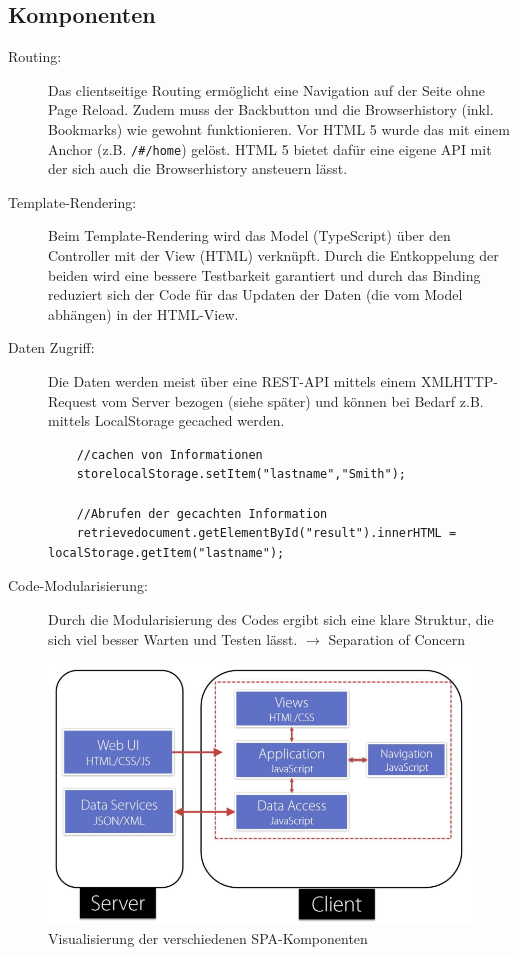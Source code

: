 \documentclass[a4paper, 11pt]{article}
\newcommand{\code}[1]{\texttt{#1}}
\begin{document}
\subsection{Komponenten}
\begin{description}
	\item[Routing: ] Das clientseitige Routing ermöglicht eine Navigation auf der Seite ohne Page Reload. Zudem muss der Backbutton und die Browserhistory (inkl. Bookmarks) wie gewohnt funktionieren. Vor HTML 5 wurde das mit einem Anchor (z.B. \code{/\#/home}) gelöst. HTML 5 bietet dafür eine eigene API mit der sich auch die Browserhistory ansteuern lässt.
	\item[Template-Rendering: ] Beim Template-Rendering wird das Model (TypeScript) über den Controller mit der View (HTML) verknüpft. Durch die Entkoppelung der beiden wird eine bessere Testbarkeit garantiert und durch das Binding reduziert sich der Code für das Updaten der Daten (die vom Model abhängen) in der HTML-View.
	\item[Daten Zugriff: ] Die Daten werden meist über eine REST-API mittels einem XMLHTTP-Request vom Server bezogen (siehe später) und können bei Bedarf z.B. mittels LocalStorage gecached werden. 
	\begin{lstlisting}
	//cachen von Informationen
	storelocalStorage.setItem("lastname","Smith");
	
	//Abrufen der gecachten Information
	retrievedocument.getElementById("result").innerHTML = localStorage.getItem("lastname");
	\end{lstlisting}
	\item[Code-Modularisierung: ] Durch die Modularisierung des Codes ergibt sich eine klare Struktur, die sich viel besser Warten und Testen lässt. $\rightarrow$ Separation of Concern
\end{description}
 \begin{figure}[htb]
 	\centering
 	\includegraphics[keepaspectratio=true,height=14\baselineskip]{spa_comp.PNG}
 	\caption{Visualisierung der verschiedenen SPA-Komponenten}
 	\label{fig:SPAComp}
 \end{figure}
\end{document}
